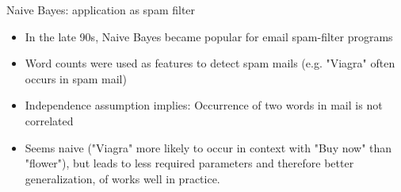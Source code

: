 \documentclass[11pt,compress,t,notes=noshow, xcolor=table]{beamer}
\begin{document}





\begin{vbframe}{Naive Bayes: application as spam filter}
\begin{itemize}
  \item In the late 90s, Naive Bayes became popular for email spam-filter programs
  \item Word counts were used as features to detect spam mails (e.g. "Viagra" often occurs in spam mail)
  \item Independence assumption implies: Occurrence of two words in mail is not correlated
  \item Seems naive ("Viagra" more likely to occur in context with "Buy now" than "flower"), but leads to less required parameters and therefore better generalization, of works well in practice.
\end{itemize}
\end{vbframe}


\endlecture
\end{document}
